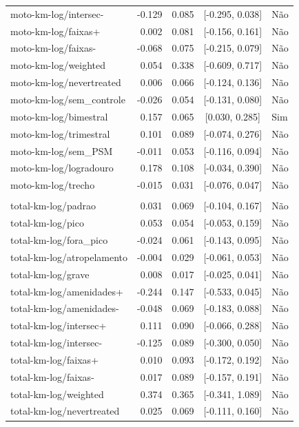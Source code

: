 \begin{longtable}{lrrcl}
moto-km-log/intersec- & -0.129 & 0.085 & {}[-0.295, 0.038] & Não\\
moto-km-log/faixas+ & 0.002 & 0.081 & {}[-0.156, 0.161] & Não\\
moto-km-log/faixas- & -0.068 & 0.075 & {}[-0.215, 0.079] & Não\\
moto-km-log/weighted & 0.054 & 0.338 & {}[-0.609, 0.717] & Não\\
moto-km-log/nevertreated & 0.006 & 0.066 & {}[-0.124, 0.136] & Não\\
moto-km-log/sem\_controle & -0.026 & 0.054 & {}[-0.131, 0.080] & Não\\
moto-km-log/bimestral & 0.157 & 0.065 & {}[0.030, 0.285] & Sim\\
moto-km-log/trimestral & 0.101 & 0.089 & {}[-0.074, 0.276] & Não\\
moto-km-log/sem\_PSM & -0.011 & 0.053 & {}[-0.116, 0.094] & Não\\
moto-km-log/logradouro & 0.178 & 0.108 & {}[-0.034, 0.390] & Não\\
moto-km-log/trecho & -0.015 & 0.031 & {}[-0.076, 0.047] & Não\\
 &  &  &  & \\
total-km-log/padrao & 0.031 & 0.069 & {}[-0.104, 0.167] & Não\\
total-km-log/pico & 0.053 & 0.054 & {}[-0.053, 0.159] & Não\\
total-km-log/fora\_pico & -0.024 & 0.061 & {}[-0.143, 0.095] & Não\\
total-km-log/atropelamento & -0.004 & 0.029 & {}[-0.061, 0.053] & Não\\
total-km-log/grave & 0.008 & 0.017 & {}[-0.025, 0.041] & Não\\
total-km-log/amenidades+ & -0.244 & 0.147 & {}[-0.533, 0.045] & Não\\
total-km-log/amenidades- & -0.048 & 0.069 & {}[-0.183, 0.088] & Não\\
total-km-log/intersec+ & 0.111 & 0.090 & {}[-0.066, 0.288] & Não\\
total-km-log/intersec- & -0.125 & 0.089 & {}[-0.300, 0.050] & Não\\
total-km-log/faixas+ & 0.010 & 0.093 & {}[-0.172, 0.192] & Não\\
total-km-log/faixas- & 0.017 & 0.089 & {}[-0.157, 0.191] & Não\\
total-km-log/weighted & 0.374 & 0.365 & {}[-0.341, 1.089] & Não\\
total-km-log/nevertreated & 0.025 & 0.069 & {}[-0.111, 0.160] & Não\\

\end{longtable}
